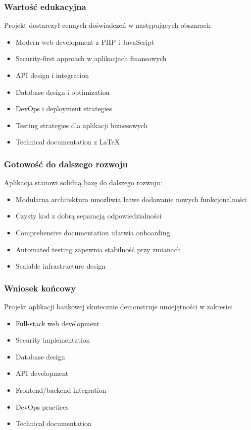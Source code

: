 \documentclass[12pt,a4paper]{article}
\begin{document}
    \subsubsection{Wartość edukacyjna}

    Projekt dostarczył cennych doświadczeń w następujących obszarach:
    \begin{itemize}
        \item Modern web development z PHP i JavaScript
        \item Security-first approach w aplikacjach finansowych
        \item API design i integration
        \item Database design i optimization
        \item DevOps i deployment strategies
        \item Testing strategies dla aplikacji biznesowych
        \item Technical documentation z LaTeX
    \end{itemize}

    \subsubsection{Gotowość do dalszego rozwoju}

    Aplikacja stanowi solidną bazę do dalszego rozwoju:
    \begin{itemize}
        \item Modularna architektura umożliwia łatwe dodawanie nowych funkcjonalności
        \item Czysty kod z dobrą separacją odpowiedzialności
        \item Comprehensive documentation ułatwia onboarding
        \item Automated testing zapewnia stabilność przy zmianach
        \item Scalable infrastructure design
    \end{itemize}

    \subsubsection{Wniosek końcowy}

    Projekt aplikacji bankowej skutecznie demonstruje umiejętności w zakresie:
    \begin{itemize}
        \item Full-stack web development
        \item Security implementation
        \item Database design
        \item API development
        \item Frontend/backend integration
        \item DevOps practices
        \item Technical documentation
    \end{itemize}
\end{document}
